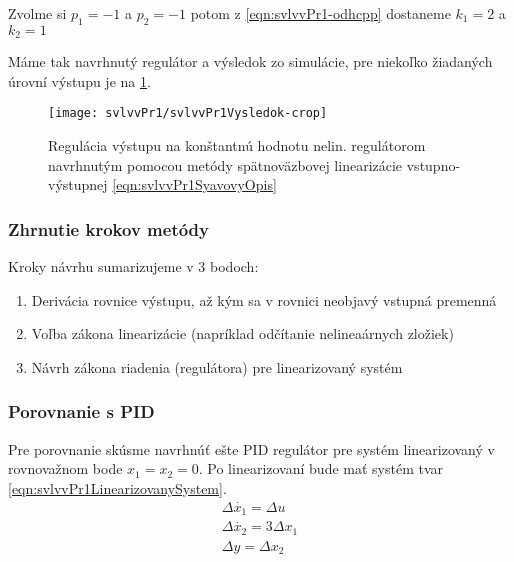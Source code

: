 \documentclass[../main.tex]{subfiles}
\begin{document}
    Zvolme si $p_1 = -1$ a $p_2 = -1$ potom z \cref{eqn:svlvvPr1-odhcpp} dostaneme $k_1=2$ a $k_2 = 1$

	Máme tak navrhnutý regulátor a výsledok zo simulácie, pre niekoľko žiadaných úrovní výstupu je na \cref{fig:svlvvPr1Vysledok}.
	\begin{figure}[h!]
		\centering
		\texttt{[image: svlvvPr1/svlvvPr1Vysledok-crop]}
		\caption{Regulácia výstupu na konštantnú hodnotu nelin. regulátorom navrhnutým pomocou metódy spätnoväzbovej linearizácie vstupno-výstupnej \cref{eqn:svlvvPr1SyavovyOpis}}
		\label{fig:svlvvPr1Vysledok}
	\end{figure}

    \subsubsection*{Zhrnutie krokov metódy}
    Kroky návrhu sumarizujeme v 3 bodoch:
    \begin{enumerate}
        \item Derivácia rovnice výstupu, až kým sa v rovnici neobjavý vstupná premenná
        \item Voľba zákona linearizácie (napríklad odčítanie nelineaárnych zložiek)
        \item Návrh zákona riadenia (regulátora) pre linearizovaný systém
    \end{enumerate}

    \subsubsection*{Porovnanie s PID}
	Pre porovnanie skúsme navrhnúť ešte PID regulátor pre systém linearizovaný v rovnovažnom bode $x_1 = x_2 = 0$. Po linearizovaní bude mať systém tvar \cref{eqn:svlvvPr1LinearizovanySystem}. 
	\begin{equation}
	\begin{gathered}
	\Delta \dot{x_1}  = \Delta u \\
	\Delta \dot{x_2} = 3\Delta x_1 \\
	\Delta y = \Delta  x_2
	\end{gathered}
	\label{eqn:svlvvPr1LinearizovanySystem}
	\end{equation}
\end{document}
